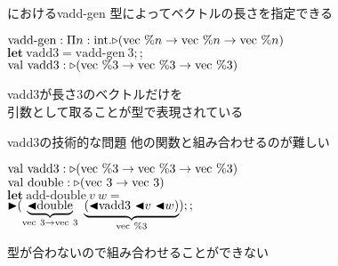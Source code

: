 \documentclass[dvipdfmx,aspectratio=169, 20pt]{beamer}
\begin{document}
\begin{frame}[fragile]{\LMD におけるvadd-gen}
    型によってベクトルの長さを指定できる
    \newcommand{\Vn}{\text{vec}\ \%n}
    \newcommand{\Vt}{\text{vec}\ \%3}
    \begin{exampleblock}{}
    \begin{tabbing}
        \hspace{5mm} \= \( \text{vadd-gen} : \Pi n:\text{int}. \TW (\Vn \to \Vn \to \Vn) \) \\[2mm]
        \> \( \textbf{let}\ \text{vadd3} = \text{vadd-gen}\ 3;; \) \\
        \> \( \text{val}\ \text{vadd3} : \TW (\Vt \to \Vt \to \Vt) \) \\[2mm]
    \end{tabbing}
    \end{exampleblock}
    vadd3が長さ3のベクトルだけを\\
    引数として取ることが型で表現されている
\end{frame}

\begin{frame}[fragile]{vadd3の技術的な問題}
    他の関数と組み合わせるのが難しい
    \newcommand{\Vn}{\text{vec}\ \%n}
    \newcommand{\Vpt}{\text{vec}\ \%3}
    \newcommand{\Vt}{\text{vec}\ 3}
    \begin{exampleblock}{}
    \begin{tabbing}
        \hspace{5mm} \= \( \text{val}\ \text{vadd3} : \TW (\Vpt \to \Vpt \to \Vpt) \) \\
        \> \( \text{val}\ \text{double} : \TW (\Vt \to \Vt) \) \\[2mm]
        \> \( \textbf{let}\ \text{add-double}\ v\ w = \) \\
        \> \hspace{5mm} \( \TB (\underbrace{\TBL\text{double}}_{\Vt \to \Vt}\ \underbrace{(\TBL \text{vadd3}\ \TBL v\ \TBL w)}_{\Vpt});; \) \\
    \end{tabbing}
    \end{exampleblock}
    型が合わないので組み合わせることができない
\end{frame}
\end{document}
